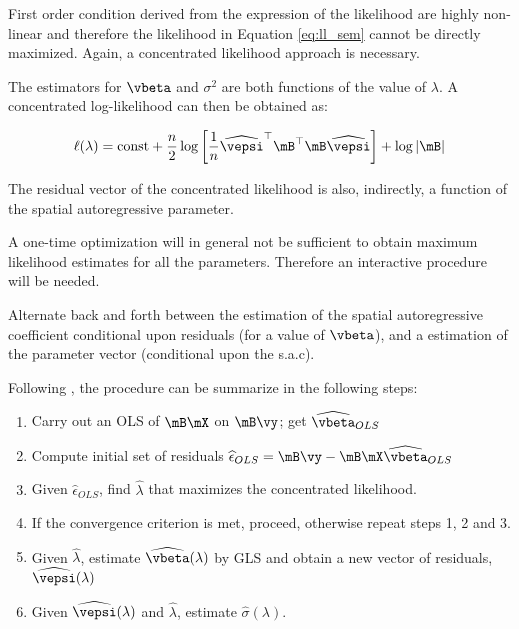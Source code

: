 \documentclass[english,12pt]{book}\usepackage[]{graphicx}\usepackage[]{xcolor}
\begin{document}
First order condition derived from the expression of the likelihood are highly non-linear and therefore the likelihood in Equation \eqref{eq:ll_sem} cannot be directly maximized. Again, a concentrated likelihood approach is necessary.

The estimators for $\vbeta$ and $\sigma^2$ are both functions of the value of $\lambda$. A concentrated log-likelihood can then be obtained as:

\begin{equation}
	\ell(\lambda)= \mbox{const} + \frac{n}{2}\log\left[\frac{1}{n}\widehat{\vepsi}^\top\mB^\top\mB \widehat{\vepsi}\right] + \log\left|\mB\right|
\end{equation}

The residual vector of the concentrated likelihood is also, indirectly, a function of the spatial autoregressive parameter.

A one-time optimization will in general not be sufficient to obtain maximum likelihood estimates for all the parameters. Therefore an interactive procedure will be needed.

Alternate back and forth between the estimation of the spatial autoregressive coefficient conditional upon residuals (for a value of $\vbeta$), and a estimation of the parameter vector (conditional upon the s.a.c). 

\begin{algorithm}

Following \cite{anselin1988spatial}, the procedure can be summarize in the following steps:

\begin{enumerate}
		\item Carry out an OLS of $\mB\mX$ on $\mB\vy$; get $\widehat{\vbeta}_{OLS}$
		\item Compute initial set of residuals $\widehat{\epsilon}_{OLS} = \mB\vy - \mB\mX\widehat{\vbeta}_{OLS}$
		\item Given $\widehat{\epsilon}_{OLS} $, find $\widehat{\lambda}$ that maximizes the concentrated likelihood.
		\item If the convergence criterion is met, proceed, otherwise repeat steps 1, 2 and 3.
		\item Given $\widehat{\lambda}$, estimate $\widehat{\vbeta}(\lambda)$ by GLS and obtain a new vector of residuals, $\widehat{\vepsi}(\lambda)$
		\item Given  $\widehat{\vepsi}(\lambda)$ and $\widehat{\lambda}$, estimate $\widehat{\sigma}(\lambda)$.
\end{enumerate}	
\end{algorithm}
\end{document}
